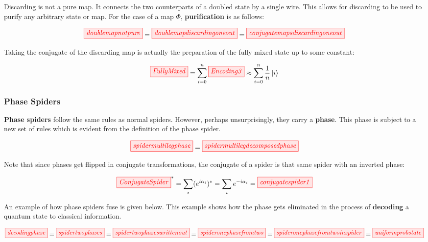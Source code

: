 \documentclass[]{article}
\begin{document}
Discarding is not a pure map. It connects the two counterparts of a doubled state by a single wire. This allows for discarding to be used to purify any arbitrary state or map. For the case of a map $\Phi$, \textbf{purification} is as follows:

\begin{equation}
\label{equation:Purification}
\tikzfig{doublemapnotpure} = \tikzfig{doublemapdiscardingoneout} = \tikzfig{conjugatemapsdiscardingoneout}
\end{equation}

Taking the conjugate of the discarding map is actually the preparation of the fully mixed state up to some constant:

\begin{equation}
	\tikzfig{FullyMixed} = \sum\limits_{i=0}^n \tikzfig{Encoding3} \approx \sum\limits_{i=0}^n \frac{1}{n} \ket{i}
\end{equation}



\subsubsection{Phase Spiders}
\label{phasespiders}

\textbf{Phase spiders} follow the same rules as normal spiders. However, perhaps unsurprisingly, they carry a \textbf{phase}. This phase is subject to a new set of rules which is evident from the definition of the phase spider. 

\begin{equation}
\label{phasespider}
\tikzfig{spidermultilegphase} = \tikzfig{spidermultilegdecomposedphase}
\end{equation}

Note that since phases get flipped in conjugate transformations, the conjugate of a spider is that same spider with an inverted phase:

\begin{equation}
	\tikzfig{ConjugateSpider}^* = \sum\limits_{i}(e^{i\alpha_i})^*= \sum\limits_{i}e^{-i\alpha_i} = \tikzfig{conjugatespider1}
\end{equation}

An example of how phase spiders fuse is given below. This example shows how the phase gets eliminated in the process of \textbf{decoding} a quantum state to classical information.


\begin{equation}
\label{eq:20}
\tikzfig{decodingphase} = \tikzfig{spidertwophases} = \tikzfig{spidertwophaseswrittenout} = \tikzfig{spideronephasefromtwo} = \tikzfig{spideronephasefromtwoinspider} =
\tikzfig{uniformprobstate}
\end{equation}
\end{document}
